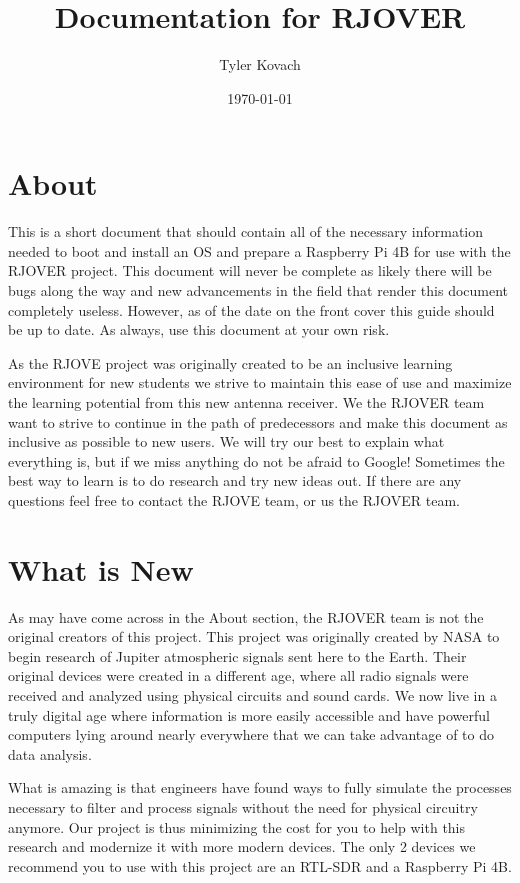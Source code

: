 \documentclass[letterpaper,12pt,notitlepage]{report} %
\title{Documentation for RJOVER}
\author{Tyler Kovach}
\date{\today}
\begin{document}
\maketitle
\tableofcontents
\section{About}
This is a short document that should contain all of the necessary information needed to boot and install an OS and prepare a Raspberry Pi 4B for use with the RJOVER project. This document will never be complete as likely there will be bugs along the way and new advancements in the field that render this document completely useless. However, as of the date on the front cover this guide should be up to date. As always, use this document at your own risk. 

As the RJOVE project was originally created to be an inclusive learning environment for new students we strive to maintain this ease of use and maximize the learning potential from this new antenna receiver. We the RJOVER team want to strive to continue in the path of predecessors and make this document as inclusive as possible to new users. We will try our best to explain what everything is, but if we miss anything do not be afraid to Google! Sometimes the best way to learn is to do research and try new ideas out. If there are any questions feel free to contact the RJOVE team, or us the RJOVER team.

\section{What is New}
As may have come across in the About section, the RJOVER team is not the original creators of this project. This project was originally created by NASA to begin research of Jupiter atmospheric signals sent here to the Earth. Their original devices were created in a different age, where all radio signals were received and analyzed using physical circuits and sound cards. We now live in a truly digital age where information is more easily accessible and have powerful computers lying around nearly everywhere that we can take advantage of to do data analysis. 

What is amazing is that engineers have found ways to fully simulate the processes necessary to filter and process signals without the need for physical circuitry anymore. Our project is thus minimizing the cost for you to help with this research and modernize it with more modern devices. The only 2 devices we recommend you to use with this project are an RTL-SDR and a Raspberry Pi 4B.
\end{document}
